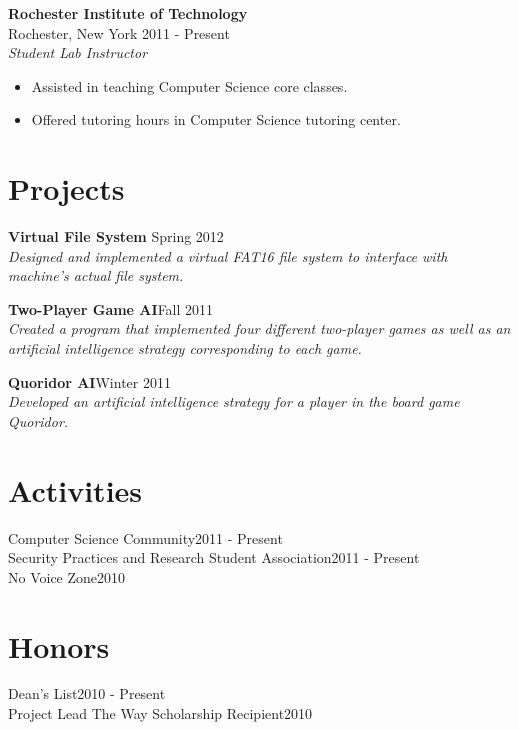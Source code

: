 \documentclass[margin]{res}
\begin{document}
\begin{resume}
\textbf{Rochester Institute of Technology} \\
Rochester, New York \hfill 2011 - Present \\
\emph{Student Lab Instructor}
\begin{itemize}
  \setlength{\itemsep}{-2pt}
  \item Assisted in teaching Computer Science core classes.
  \item Offered tutoring hours in Computer Science tutoring center. 
\end{itemize}


\section{Projects}
\textbf{Virtual File System} \hfill Spring 2012 \\
\emph{Designed and implemented a virtual FAT16 file system to interface with
machine's actual file system.}

\textbf{Two-Player Game AI}\hfill Fall 2011 \\
\emph{Created a program that implemented four different two-player games as
well as an artificial intelligence strategy corresponding to each game.}

\textbf{Quoridor AI}\hfill Winter 2011 \\
\emph{Developed an artificial intelligence strategy for a player in the board
game Quoridor.}


\section{Activities}
Computer Science Community\hfill 2011 - Present \\
Security Practices and Research Student Association\hfill 2011 - Present \\
No Voice Zone\hfill 2010


\section{Honors}
Dean's List\hfill 2010 - Present \\
Project Lead The Way Scholarship Recipient\hfill 2010

\end{resume}
\end{document}

